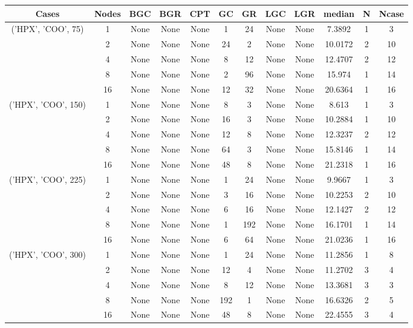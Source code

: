 \begin{tabular}{cccccccccccc}
\hline
Cases & Nodes& BGC& BGR& CPT& GC& GR& LGC& LGR& median & N & Ncase \\
\hline
\multirow{5}{*}{('HPX', 'COO', 75)}& 1& None& None& None& 1& 24& None& None& 7.3892& 1& 3\\
& 2& None& None& None& 24& 2& None& None& 10.0172& 2& 10\\
& 4& None& None& None& 8& 12& None& None& 12.4707& 2& 12\\
& 8& None& None& None& 2& 96& None& None& 15.974& 1& 14\\
& 16& None& None& None& 12& 32& None& None& 20.6364& 1& 16\\
\hline
\multirow{5}{*}{('HPX', 'COO', 150)}& 1& None& None& None& 8& 3& None& None& 8.613& 1& 3\\
& 2& None& None& None& 16& 3& None& None& 10.2884& 1& 10\\
& 4& None& None& None& 12& 8& None& None& 12.3237& 2& 12\\
& 8& None& None& None& 64& 3& None& None& 15.8146& 1& 14\\
& 16& None& None& None& 48& 8& None& None& 21.2318& 1& 16\\
\hline
\multirow{5}{*}{('HPX', 'COO', 225)}& 1& None& None& None& 1& 24& None& None& 9.9667& 1& 3\\
& 2& None& None& None& 3& 16& None& None& 10.2253& 2& 10\\
& 4& None& None& None& 6& 16& None& None& 12.1427& 2& 12\\
& 8& None& None& None& 1& 192& None& None& 16.1701& 1& 14\\
& 16& None& None& None& 6& 64& None& None& 21.0236& 1& 16\\
\hline
\multirow{5}{*}{('HPX', 'COO', 300)}& 1& None& None& None& 1& 24& None& None& 11.2856& 1& 8\\
& 2& None& None& None& 12& 4& None& None& 11.2702& 3& 4\\
& 4& None& None& None& 8& 12& None& None& 13.3681& 3& 3\\
& 8& None& None& None& 192& 1& None& None& 16.6326& 2& 5\\
& 16& None& None& None& 48& 8& None& None& 22.4555& 3& 4\\
\hline
\end{tabular}



